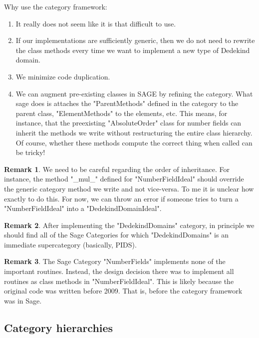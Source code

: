 \documentclass{amsart}
\theoremstyle{definition}
\newtheorem*{remark*}{Remark}
\begin{document}
			\bigskip
			
			Why use the category framework:
			\begin{enumerate}
				\item 
					It really does not seem like it is that difficult to use.
				\item
					If our implementations are sufficiently generic, then we do not need to rewrite the class methods every time we want to implement a new type of Dedekind domain.
				\item
					We minimize code duplication.
				\item
					We can augment pre-existing classes in SAGE by refining the category. What sage does is attaches the "ParentMethods" defined in the category to the parent class, "ElementMethods" to the elements, etc. This means, for instance, that the preexisting "AbsoluteOrder" class for number fields can inherit the methods we write without restructuring the entire class hierarchy. Of course, whether these methods compute the correct thing when called can be tricky!
				\end{enumerate}
			
			\begin{remark*}
				We need to be careful regarding the order of inheritance. For instance, the method "\_mul\_" defined for "NumberFieldIdeal" should override the generic category method we write and not vice-versa. To me it is unclear how exactly to do this. For now, we can throw an error if someone tries to turn a "NumberFieldIdeal" into a "DedekindDomainIdeal".
			\end{remark*}
			
			\begin{remark*}
				After implementing the "DedekindDomains" category, in principle we should find all of the Sage Categories for which "DedekindDomains" is an immediate supercategory (basically, PIDS). 
			\end{remark*}
	
			\begin{remark*}
				The Sage Category "NumberFields" implements none of the important routines. Instead, the design decision there was to implement all routines as class methods in "NumberFieldIdeal". This is likely because the original code was written before 2009. That is, before the category framework was in Sage. 
			\end{remark*}
	
	\subsection{Category hierarchies}
	
\end{document}
